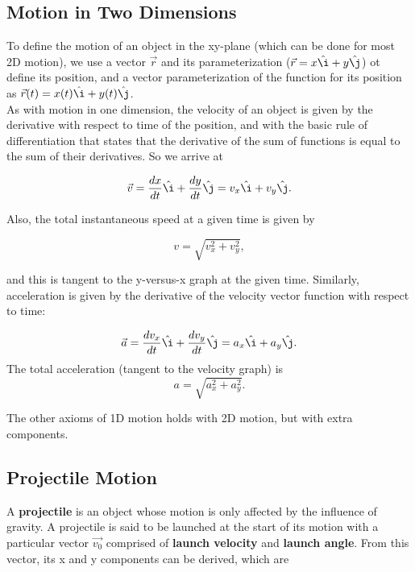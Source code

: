 \documentclass[12pt,letterpaper]{article}
\newcommand{\ihat}{\hat{\i}}
\newcommand{\jhat}{\hat{\j}}
\begin{document}
\subsection[Motion in Two Dimensions]{Motion in Two Dimensions}

To define the motion of an object in the xy-plane (which can be done for most 2D motion), we use a vector $\vec{r}$ and its parameterization ($\vec{r} = x\ihat + y\jhat$) ot define its position, and a vector parameterization of the function for its position as $\vec{r}(t) = x(t)\ihat + y(t)\jhat$. \\

As with motion in one dimension, the velocity of an object is given by the derivative with respect to time of the position, and with the basic rule of differentiation that states that the derivative of the sum of functions is equal to the sum of their derivatives. So we arrive at

\begin{center}
	$$\vec{v} = \frac{dx}{dt}\ihat + \frac{dy}{dt}\jhat = v_{x}\ihat + v_{y}\jhat.$$ \linebreak
\end{center}

Also, the total instantaneous speed at a given time is given by

\begin{center}
	$$v = \sqrt{v_{x}^{2} + v_{y}^{2}},$$ \linebreak
\end{center}

and this is tangent to the y-versus-x graph at the given time. Similarly, acceleration is given by the derivative of the velocity vector function with respect to time:

\begin{center}
	$$\vec{a} = \frac{dv_{x}}{dt}\ihat + \frac{dv_{y}}{dt}\jhat = a_{x}\ihat + a_{y}\jhat.$$ The total acceleration (tangent to the velocity graph) is
	$$a = \sqrt{a_{x}^{2} + a_{y}^{2}}.$$ \linebreak
\end{center}

The other axioms of 1D motion holds with 2D motion, but with extra components.

\subsection[Projectile Motion]{Projectile Motion}

A \textbf{projectile} is an object whose motion is only affected by the influence of gravity. A projectile is said to be launched at the start of its motion with a particular vector $\vec{v_{0}}$ comprised of \textbf{launch velocity} and \textbf{launch angle}. From this vector, its x and y components can be derived, which are
\end{document}
